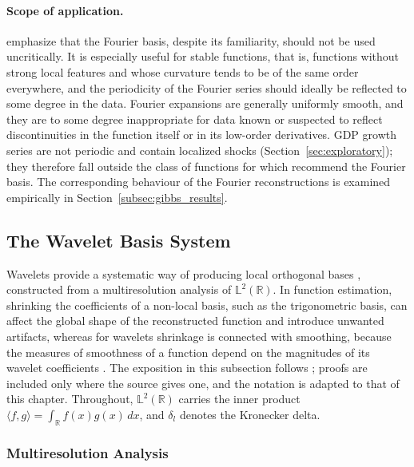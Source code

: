 \paragraph{Scope of application.} \cite[Sec.~3.4]{ramsay2005} emphasize that
the Fourier basis, despite its familiarity, should not be used uncritically.
It is especially useful for stable functions, that is, functions without
strong local features and whose curvature tends to be of the same order
everywhere, and the periodicity of the Fourier series should ideally be
reflected to some degree in the data. Fourier expansions are generally
uniformly smooth, and they are to some degree inappropriate for data known
or suspected to reflect discontinuities in the function itself or in its
low-order derivatives. GDP growth series are not periodic and contain
localized shocks (Section~\ref{sec:exploratory}); they therefore fall
outside the class of functions for which \cite[Sec.~3.4]{ramsay2005}
recommend the Fourier basis. The corresponding behaviour of the Fourier
reconstructions is examined empirically in Section~\ref{subsec:gibbs_results}.

\subsection{The Wavelet Basis System}
\label{subsec:wavelet_theory}

Wavelets provide a systematic way of producing local orthogonal bases
\cite{vidakovic1999}, constructed from a multiresolution analysis of
$\mathbb{L}^2(\mathbb{R})$. In function estimation, shrinking the
coefficients of a non-local basis, such as the trigonometric basis, can
affect the global shape of the reconstructed function and introduce
unwanted artifacts, whereas for wavelets shrinkage is connected with
smoothing, because the measures of smoothness of a function depend on the
magnitudes of its wavelet coefficients \cite[Ch.~6]{vidakovic1999}. The exposition in this subsection follows
\cite{vidakovic1999}; proofs are included only where the source gives one,
and the notation is adapted to that of this chapter. Throughout, $\mathbb{L}^2(\mathbb{R})$ carries the inner
product $\langle f,g\rangle = \int_{\mathbb{R}}f(x)g(x)\,dx$, and
$\delta_l$ denotes the Kronecker delta.

\subsubsection{Multiresolution Analysis}

